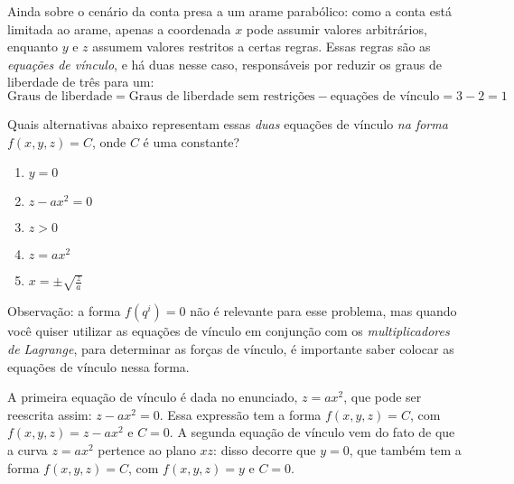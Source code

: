 \begin{question}
    Ainda sobre o cenário da conta presa a um arame parabólico: como a conta está limitada ao arame, apenas a coordenada $x$ pode assumir valores arbitrários, enquanto $y$ e $z$ assumem valores restritos a certas regras.
    Essas regras são as \emph{equações de vínculo}, e há duas nesse caso, responsáveis por reduzir os graus de liberdade de três para um:
    \begin{equation*}
      \text{Graus de liberdade} = \text{Graus de liberdade sem restrições} - \text{equações de vínculo}
                                = 3 - 2 = 1
    \end{equation*}

    Quais alternativas abaixo representam essas \emph{duas} equações de vínculo \emph{na forma} $f(x,y,z) = C$, onde $C$ é uma constante?
    \begin{enumerate}
      \item $y = 0$ \rightanswer
      \item $z - ax^2 = 0$ \rightanswer
      \item $z > 0$
      \item $z = ax^2$
      \item $x = \pm \sqrt{\frac{z}{a}}$
    \end{enumerate}

    \bigskip
    \begin{compactdesc}
      \item[Observação:] a forma $f(q^i) = 0$ não é relevante para esse problema, mas quando você quiser utilizar as equações de vínculo em conjunção com os \emph{multiplicadores de Lagrange}, para determinar as forças de vínculo, é importante saber colocar as equações de vínculo nessa forma.
    \end{compactdesc}

    \begin{solution}
      A primeira equação de vínculo é dada no enunciado, $z = ax^2$, que pode ser reescrita assim: $z - ax^2 = 0$.
      Essa expressão tem a forma $f(x,y,z) = C$, com $f(x,y,z) = z - ax^2$ e $C = 0$.
      A segunda equação de vínculo vem do fato de que a curva $z = ax^2$ pertence ao plano $xz$: disso decorre que $y = 0$, que também tem a forma $f(x,y,z) = C$, com $f(x,y,z) = y$ e $C = 0$.
    \end{solution}
\end{question}